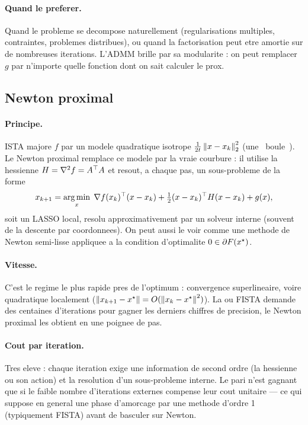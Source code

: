 \paragraph{Quand le preferer.} Quand le probleme se decompose naturellement
(regularisations multiples, contraintes, problemes distribues), ou quand la
factorisation peut etre amortie sur de nombreuses iterations. L'ADMM brille par
sa modularite : on peut remplacer $g$ par n'importe quelle fonction dont on sait
calculer le prox.

\subsection{Newton proximal}

\paragraph{Principe.} ISTA majore $f$ par un modele quadratique isotrope
$\tfrac{1}{2t}\left\lVert x - x_k \right\rVert_2^2$ (une \guillemotleft{}~boule~\guillemotright{}). Le Newton proximal
remplace ce modele par la vraie courbure : il utilise la hessienne
$H = \nabla^2 f = A^{\top} A$ et resout, a chaque pas, un sous-probleme de la forme
\[
  x_{k+1} = \operatorname*{arg\,min}_x\;
    \nabla f(x_k)^{\top} (x - x_k)
    + \tfrac{1}{2}(x - x_k)^{\top} H (x - x_k)
    + g(x),
\]
soit un LASSO local, resolu approximativement par un solveur interne (souvent de
la descente par coordonnees). On peut aussi le voir comme une methode de Newton
semi-lisse appliquee a la condition d'optimalite $0 \in \partial F(x^{\star})$.

\paragraph{Vitesse.} C'est le regime le plus rapide pres de l'optimum :
convergence superlineaire, voire quadratique localement
($\left\lVert x_{k+1} - x^{\star} \right\rVert = O(\left\lVert x_k - x^{\star} \right\rVert^2)$). La ou FISTA demande des
centaines d'iterations pour gagner les derniers chiffres de precision, le Newton
proximal les obtient en une poignee de pas.

\paragraph{Cout par iteration.} Tres eleve : chaque iteration exige une
information de second ordre (la hessienne ou son action) et la resolution d'un
sous-probleme interne. Le pari n'est gagnant que si le faible nombre
d'iterations externes compense leur cout unitaire --- ce qui suppose en general
une phase d'amorcage par une methode d'ordre 1 (typiquement FISTA) avant de
basculer sur Newton.

